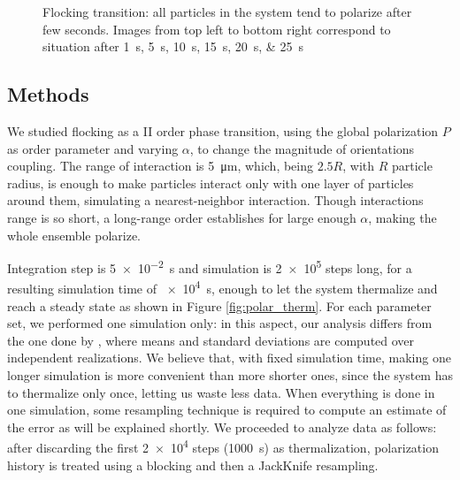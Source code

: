 \documentclass[../../master_thesis_np.tex]{subfiles}
\begin{document}
\begin{figure}[hbtp]
			\caption{Flocking transition: all particles in the system tend to polarize after few seconds. Images from top left to bottom right correspond to situation after \qtylist{1;5;10;15;20;25}{\second}}
			\label{fig:flock40}
		\end{figure}
		
		\subsection{Methods}	
		We studied flocking as a II order phase transition, using the global polarization $P$ as order parameter and varying $\alpha$, to change the magnitude of orientations coupling. 
		The range of interaction is \SI{5}{\micro\meter}, which, being $2.5R$, with $R$ particle radius, is enough to make particles interact only with one layer of particles around them, simulating a nearest-neighbor interaction.
		Though interactions range is so short, a long-range order establishes for large enough $\alpha$, making the whole ensemble polarize.
		
		Integration step is \SI{5e-2}{\second} and simulation is \num{2e5} steps long, for a resulting simulation time of \SI{e4}{\second}, enough to let the system thermalize and reach a steady state as shown in Figure \ref{fig:polar_therm}.
		For each parameter set, we performed one simulation only: in this aspect, our analysis differs from the one done by \citeauthor{martin-gomez_collective_2018}, where means and standard deviations are computed over independent realizations.
		We believe that, with fixed simulation time, making one longer simulation is more convenient than more shorter ones, since the system has to thermalize only once, letting us waste less data.
		When everything is done in one simulation, some resampling technique is required to compute an estimate of the error as will be explained shortly.
		We proceeded to analyze data as follows: after discarding the first \num{2e4} steps (\SI{1000}{\second}) as thermalization, polarization history is treated using a blocking and then a JackKnife resampling.
		
\end{document}
